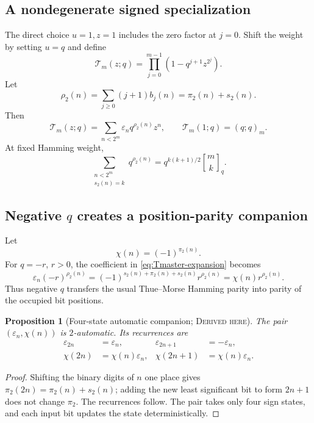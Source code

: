 \documentclass[11pt,oneside]{article}
\newtheorem{proposition}[theorem]{Proposition}
\theoremstyle{definition}
\theoremstyle{remark}
\newcommand{\qbinom}[3]{\genfrac{[}{]}{0pt}{}{#1}{#2}_{#3}}
\newcommand{\epsTM}{\varepsilon}
\newcommand{\Derived}{\textsc{Derived here}}
\begin{document}
\subsection{A nondegenerate signed specialization}
The direct choice \(u=1,z=1\) includes the zero factor at \(j=0\).  Shift the
weight by setting \(u=q\) and define
\begin{equation}\label{eq:Tmaster}
 \mathcal T_m(z;q)=\prod_{j=0}^{m-1}(1-q^{j+1}z^{2^j}).
\end{equation}
Let
\[
 \rho_2(n)=\sum_{j\ge0}(j+1)b_j(n)=\pi_2(n)+s_2(n).
\]
Then
\begin{equation}\label{eq:Tmaster-expansion}
 \mathcal T_m(z;q)=
 \sum_{n<2^m}\epsTM_nq^{\rho_2(n)}z^n,
 \qquad
 \mathcal T_m(1;q)=(q;q)_m.
\end{equation}
At fixed Hamming weight,
\begin{equation}\label{eq:T-fixed}
 \sum_{\substack{n<2^m\\s_2(n)=k}}q^{\rho_2(n)}
 =q^{k(k+1)/2}\qbinom{m}{k}{q}.
\end{equation}

\subsection{Negative \texorpdfstring{\(q\)}{q} creates a position-parity companion}
Let
\begin{equation}\label{eq:chi}
 \chi(n)=(-1)^{\pi_2(n)}.
\end{equation}
For \(q=-r\), \(r>0\), the coefficient in \eqref{eq:Tmaster-expansion}
becomes
\begin{equation}\label{eq:negative-position-parity}
 \epsTM_n(-r)^{\rho_2(n)}
 =(-1)^{s_2(n)+\pi_2(n)+s_2(n)}r^{\rho_2(n)}
 =\chi(n)r^{\rho_2(n)}.
\end{equation}
Thus negative \(q\) transfers the usual Thue--Morse Hamming parity into parity
of the occupied bit positions.

\begin{proposition}[Four-state automatic companion; \Derived]
The pair \((\epsTM_n,\chi(n))\) is \(2\)-automatic.  Its recurrences are
\begin{align}
 \epsTM_{2n}&=\epsTM_n,&\epsTM_{2n+1}&=-\epsTM_n,\label{eq:eps-rec}\\
 \chi(2n)&=\chi(n)\epsTM_n,&
 \chi(2n+1)&=\chi(n)\epsTM_n.\label{eq:chi-rec}
\end{align}
\end{proposition}

\begin{proof}
Shifting the binary digits of \(n\) one place gives
\(\pi_2(2n)=\pi_2(n)+s_2(n)\); adding the new least significant bit to form
\(2n+1\) does not change \(\pi_2\).  The recurrences follow.  The pair takes
only four sign states, and each input bit updates the state deterministically.
\end{proof}
\end{document}
